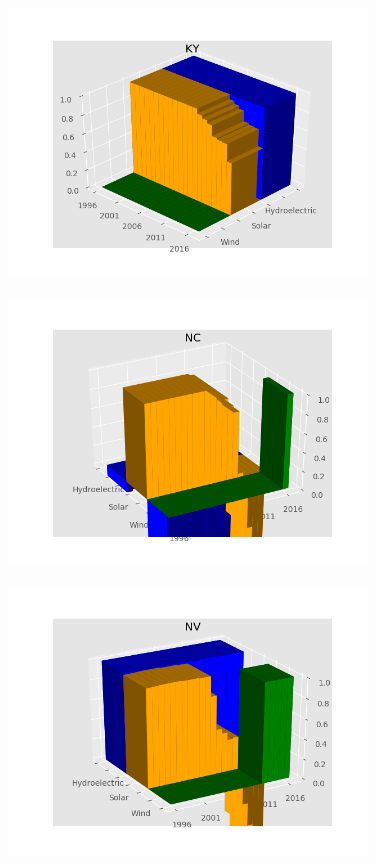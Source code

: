 \documentclass[12pt]{article}
\begin{document}
\begin{figure}[!htbp]
\centering
\includegraphics[width=0.85\textwidth]{KY.png}
\end{figure}

\begin{figure}[!htbp]
\centering
\includegraphics[width=0.85\textwidth]{NC.png}
\end{figure}

\begin{figure}[!htbp]
\centering
\includegraphics[width=0.85\textwidth]{NV.png}
\end{figure}
\end{document}
